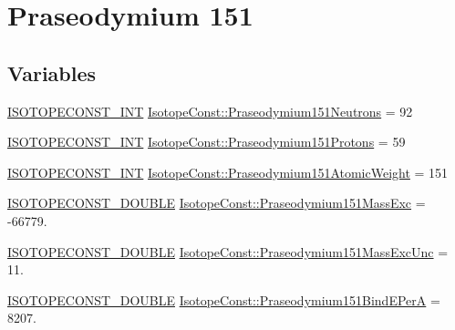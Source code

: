 \hypertarget{group___isotope_const-_praseodymium-_pr151}{}\section{Praseodymium 151}
\label{group___isotope_const-_praseodymium-_pr151}
\subsection*{Variables}
\begin{DoxyCompactItemize}
\item 
\mbox{\hyperlink{group___isotope_const-_macros_ga5f18360b3e99483a35c32d789e62621c}{I\+S\+O\+T\+O\+P\+E\+C\+O\+N\+S\+T\+\_\+\+I\+NT}} \mbox{\hyperlink{group___isotope_const-_praseodymium-_pr151_gacf4b58525816b8f0b1c696ba9f9c1bb1}{Isotope\+Const\+::\+Praseodymium151\+Neutrons}} = 92
\item 
\mbox{\hyperlink{group___isotope_const-_macros_ga5f18360b3e99483a35c32d789e62621c}{I\+S\+O\+T\+O\+P\+E\+C\+O\+N\+S\+T\+\_\+\+I\+NT}} \mbox{\hyperlink{group___isotope_const-_praseodymium-_pr151_gaa783c6fcd48832c09ac01a8f90f768ad}{Isotope\+Const\+::\+Praseodymium151\+Protons}} = 59
\item 
\mbox{\hyperlink{group___isotope_const-_macros_ga5f18360b3e99483a35c32d789e62621c}{I\+S\+O\+T\+O\+P\+E\+C\+O\+N\+S\+T\+\_\+\+I\+NT}} \mbox{\hyperlink{group___isotope_const-_praseodymium-_pr151_ga28d740e6d0ee5df5df0502c75c7fc738}{Isotope\+Const\+::\+Praseodymium151\+Atomic\+Weight}} = 151
\item 
\mbox{\hyperlink{group___isotope_const-_macros_ga8f45a7272ce02c0b4c65c44636ed719a}{I\+S\+O\+T\+O\+P\+E\+C\+O\+N\+S\+T\+\_\+\+D\+O\+U\+B\+LE}} \mbox{\hyperlink{group___isotope_const-_praseodymium-_pr151_ga368b3fa4cfaa5421af60081700b81261}{Isotope\+Const\+::\+Praseodymium151\+Mass\+Exc}} = -\/66779.
\item 
\mbox{\hyperlink{group___isotope_const-_macros_ga8f45a7272ce02c0b4c65c44636ed719a}{I\+S\+O\+T\+O\+P\+E\+C\+O\+N\+S\+T\+\_\+\+D\+O\+U\+B\+LE}} \mbox{\hyperlink{group___isotope_const-_praseodymium-_pr151_ga43d2257e63476ef5e7a23e31b4a04778}{Isotope\+Const\+::\+Praseodymium151\+Mass\+Exc\+Unc}} = 11.
\item 
\mbox{\hyperlink{group___isotope_const-_macros_ga8f45a7272ce02c0b4c65c44636ed719a}{I\+S\+O\+T\+O\+P\+E\+C\+O\+N\+S\+T\+\_\+\+D\+O\+U\+B\+LE}} \mbox{\hyperlink{group___isotope_const-_praseodymium-_pr151_gac3ee3ff2724db3de6954f7cdc6c5588a}{Isotope\+Const\+::\+Praseodymium151\+Bind\+E\+PerA}} = 8207.

\end{DoxyCompactItemize}
